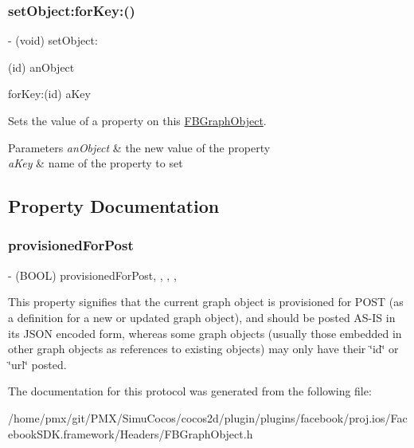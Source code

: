 \subsubsection{\texorpdfstring{set\+Object\+:for\+Key\+:()}{setObject:forKey:()}\hspace{0.1cm}{\footnotesize\ttfamily [5/5]}}
{\footnotesize\ttfamily -\/ (void) set\+Object\+: \begin{DoxyParamCaption}\item[{(id)}]{an\+Object }\item[{forKey:(id)}]{a\+Key }\end{DoxyParamCaption}}

Sets the value of a property on this {\ttfamily \hyperlink{interfaceFBGraphObject}{F\+B\+Graph\+Object}}.


\begin{DoxyParams}{Parameters}
{\em an\+Object} & the new value of the property \\
\hline
{\em a\+Key} & name of the property to set \\
\hline
\end{DoxyParams}


\subsection{Property Documentation}
\mbox{\label{protocolFBGraphObject-p_a0f1fd42624dd3d7a43588df67ae1e6a8}} 
\subsubsection{\texorpdfstring{provisioned\+For\+Post}{provisionedForPost}}
{\footnotesize\ttfamily -\/ (B\+O\+OL) provisioned\+For\+Post\hspace{0.3cm}{\ttfamily [read]}, {\ttfamily [write]}, {\ttfamily [optional]}, {\ttfamily [nonatomic]}, {\ttfamily [assign]}}

This property signifies that the current graph object is provisioned for P\+O\+ST (as a definition for a new or updated graph object), and should be posted A\+S-\/\+IS in its J\+S\+ON encoded form, whereas some graph objects (usually those embedded in other graph objects as references to existing objects) may only have their \char`\"{}id\char`\"{} or \char`\"{}url\char`\"{} posted. 

The documentation for this protocol was generated from the following file\+:\begin{DoxyCompactItemize}
\item 
/home/pmx/git/\+P\+M\+X/\+Simu\+Cocos/cocos2d/plugin/plugins/facebook/proj.\+ios/\+Facebook\+S\+D\+K.\+framework/\+Headers/F\+B\+Graph\+Object.\+h\end{DoxyCompactItemize}
